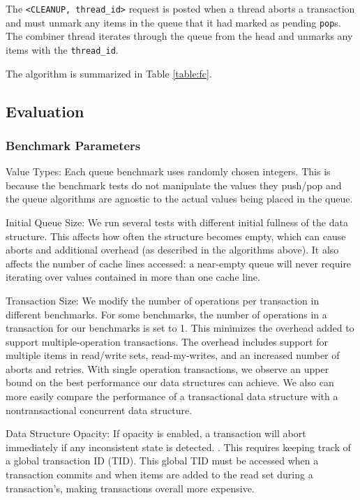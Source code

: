 The \texttt{<CLEANUP, thread\_id>} request is posted when a thread aborts a transaction and must unmark any items in the queue that it had marked as pending \texttt{pop}s. The combiner thread iterates through the queue from the head and unmarks any items with the \texttt{thread\_id}.

The algorithm is summarized in Table \ref{table:fc}.

\subsection{Evaluation}

\subsubsection{Benchmark Parameters}
\begin{bullets}
\item Value Types: Each queue benchmark uses randomly chosen integers. This is because the benchmark tests do not manipulate the values they push/pop and the queue algorithms are agnostic to the actual values being placed in the queue.

\item Initial Queue Size: We run several tests with different initial fullness of the data structure. This affects how often the structure becomes empty, which can cause aborts and additional overhead (as described in the algorithms above). It also affects the number of cache lines accessed: a near-empty queue will never require iterating over values contained in more than one cache line.

\item Transaction Size: We modify the number of operations per transaction in different benchmarks. For some benchmarks, the number of operations in a transaction for our benchmarks is set to 1. This minimizes the overhead added to support multiple-operation transactions. The overhead includes support for multiple items in read/write sets, read-my-writes, and an increased number of aborts and retries. With single operation transactions, we observe an upper bound on the best performance our data structures can achieve. We also can more easily compare the performance of a transactional data structure with a nontransactional concurrent data structure.

\item Data Structure Opacity: If opacity is enabled, a transaction will abort immediately if any inconsistent state is detected. . This requires keeping track of a global transaction ID (TID). This global TID must be accessed when a transaction commits and when items are added to the read set during a transaction's, making transactions overall more expensive.
\end{bullets}

